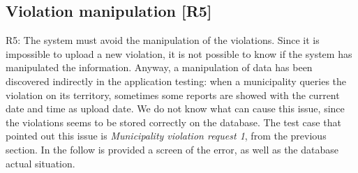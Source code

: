\documentclass[../ATD.tex]{subfiles}
\begin{document}
    \subsection{Violation manipulation [R5]}\label{subsec:violation-manipulation.}
    R5: The system must avoid the manipulation of the violations.
    \newline
    Since it is impossible to upload a new violation, it is not possible to know if the system has manipulated the information.
    Anyway, a manipulation of data has been discovered indirectly in the application testing: when a municipality queries the violation on its territory, sometimes some reports are showed with the current date and time as upload date.
    We do not know what can cause this issue, since the violations seems to be stored correctly on the database.
    The test case that pointed out this issue is \textit{Municipality violation request 1}, from the previous section.
    In the follow is provided a screen of the error, as well as the database actual situation.
\end{document}
